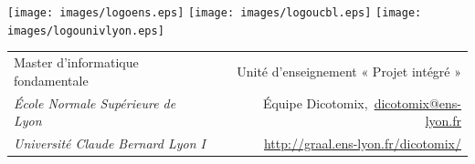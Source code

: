 \documentclass[11pt,a4paper]{article}
\theoremstyle{plain}
\theoremstyle{definition}
\begin{document}
\setlength{\parindent}{0pt}

\thispagestyle{empty}

\texttt{[image: images/logoens.eps]} \hfill \texttt{[image: images/logoucbl.eps]} \hfill \texttt{[image: images/logounivlyon.eps]}

\vspace{0.5cm}

\begin{tabularx}{\textwidth}{@{} l X r @{} }
{\sc Master d'informatique fondamentale} & & Unité d'enseignement « Projet intégré »\\
{\it École Normale Supérieure de Lyon} & & Équipe Dicotomix,\ \href{mailto:dicotomix@ens-lyon.fr}{dicotomix@ens-lyon.fr} \\
{\it Université Claude Bernard Lyon I} & & \url{http://graal.ens-lyon.fr/dicotomix/}
\end{tabularx}
\end{document}
